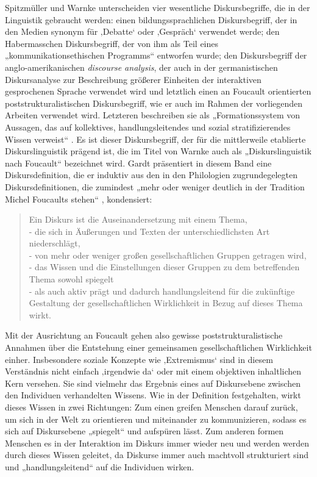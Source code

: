 Spitzmüller und Warnke \autocite*[9]{spitzmullerDiskurslinguistikEinfuhrungTheorien2011} unterscheiden vier wesentliche Diskursbegriffe, die in der Linguistik gebraucht werden: einen bildungssprachlichen Diskursbegriff, der in den Medien synonym für ‚Debatte` oder ‚Gespräch` verwendet werde; den Habermasschen Diskursbegriff, der von ihm als Teil eines „kommunikationsethischen Programms`` entworfen wurde; den Diskursbegriff der anglo-amerikanischen \emph{discourse analysis}, der auch in der germanistischen Diskursanalyse zur Beschreibung größerer Einheiten der interaktiven gesprochenen Sprache verwendet wird und letztlich einen an Foucault orientierten poststrukturalistischen Diskursbegriff, wie er auch im Rahmen der vorliegenden Arbeiten verwendet wird. Letzteren beschreiben sie als „Formationssystem von Aussagen, das auf kollektives, handlungsleitendes und sozial stratifizierendes Wissen verweist`` \autocite[9]{spitzmullerDiskurslinguistikEinfuhrungTheorien2011}. Es ist dieser Diskursbegriff, der für die mittlerweile etablierte Diskurslinguistik prägend ist, die im Titel von Warnke \autocite*{warnkeDiskurslinguistikNachFoucault2007} auch als „Diskurslinguistik nach Foucault`` bezeichnet wird. Gardt präsentiert in diesem Band eine Diskursdefinition, die er induktiv aus den in den Philologien zugrundegelegten Diskursdefinitionen, die zumindest „mehr oder weniger deutlich in der Tradition Michel Foucaults stehen`` \autocite*[28]{gardtDiskursanalyseAktuellerTheoretischer2007}, kondensiert:

\begin{quote}
Ein Diskurs ist die Auseinandersetzung mit einem Thema,\\
- die sich in Äußerungen und Texten der unterschiedlichsten Art niederschlägt,\\
- von mehr oder weniger großen gesellschaftlichen Gruppen getragen wird,\\
- das Wissen und die Einstellungen dieser Gruppen zu dem betreffenden Thema sowohl spiegelt\\
- als auch aktiv prägt und dadurch handlungsleitend für die zukünftige Gestaltung der gesellschaftlichen Wirklichkeit in Bezug auf dieses Thema wirkt. \autocite[30]{gardtDiskursanalyseAktuellerTheoretischer2007}
\end{quote}

Mit der Ausrichtung an Foucault gehen also gewisse poststrukturalistische Annahmen über die Entstehung einer gemeinsamen gesellschaftlichen Wirklichkeit einher. Insbesondere soziale Konzepte wie ‚Extremismus` sind in diesem Verständnis nicht einfach ‚irgendwie da` oder mit einem objektiven inhaltlichen Kern versehen. Sie sind vielmehr das Ergebnis eines auf Diskursebene zwischen den Individuen verhandelten Wissens. Wie in der Definition festgehalten, wirkt dieses Wissen in zwei Richtungen: Zum einen greifen Menschen darauf zurück, um sich in der Welt zu orientieren und miteinander zu kommunizieren, sodass es sich auf Diskursebene „spiegelt`` und aufspüren lässt. Zum anderen formen Menschen es in der Interaktion im Diskurs immer wieder neu und werden werden durch dieses Wissen geleitet, da Diskurse immer auch machtvoll strukturiert sind und „handlungsleitend`` auf die Individuen wirken.

